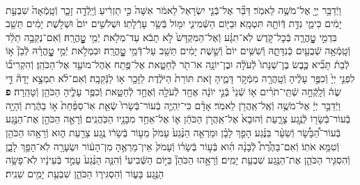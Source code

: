 \documentclass[twoside, openany, parskip=half, 11pt]{book}
\begin{document}
\begin{footnotesize}
\begin{multicols}{2}
\\
וַיְֿדַבֵּ֥ר יְיָ֖ אֶל־מֹשֶׁ֥ה לֵּאמֹֽר׃ דַּבֵּ֞ר אֶל־בְּֿנֵ֤י יִשְׂרָאֵל֙ לֵאמֹ֔ר אִשָּׁה֙ כִּ֣י תַזְרִ֔יעַ וְֿיָֽלְֿדָ֖ה זָכָ֑ר וְֿטָֽמְֿאָה֙ שִׁבְעַ֣ת יָמִ֔ים כִּימֵ֛י נִדַּ֥ת דְּֿוֹתָ֖הּ תִּטְמָֽא׃ וּבַיּ֖וֹם הַשְּֿׁמִינִ֑י יִמּ֖וֹל בְּֿשַׂ֥ר עָרְֿלָתֽוֹ׃ וּשְׁלֹשִׁ֥ים יוֹם֙ וּשְׁלֹ֣שֶׁת יָמִ֔ים תֵּשֵׁ֖ב בִּדְמֵ֣י טׇׇׇׇׇׇָֽהֳרָ֑ה בְּֿכׇל־קֹ֣דֶשׁ לֹֽא־תִגָּ֗ע וְֿאֶל־הַמִּקְדָּשׁ֙ לֹ֣א תָבֹ֔א עַד־מְלֹ֖את יְֿמֵ֥י טׇׇׇׇׇׇׇָֽהֳרָֽהּ׃  וְֿאִם־נְקֵבָ֣ה תֵלֵ֔ד וְֿטָֽמְֿאָ֥ה שְֿׁבֻעַ֖יִם כְּֿנִדָּתָ֑הּ וְֿשִׁשִּׁ֥ים יוֹם֙ וְֿשֵׁ֣שֶׁת יָמִ֔ים תֵּשֵׁ֖ב עַל־דְּֿמֵ֥י טׇׇׇׇׇׇׇָֽהֳרָֽה׃ וּבִמְלֹ֣את יְֿמֵ֣י טׇׇׇׇׇׇָֽהֳרָ֗הּ לְֿבֵן֘ א֣וֹ לְֿבַת֒ תָּבִ֞יא כֶּ֤בֶשׂ בֶּן־שְׁנָתוֹ֙ לְֿעֹלָ֔ה וּבֶן־יוֹנָ֥ה אוֹ־תֹ֖ר לְֿחַטָּ֑את אֶל־פֶּ֥תַח אֹֽהֶל־מוֹעֵ֖ד אֶל־הַכֹּהֵֽן׃ וְֿהִקְרִיב֞וֹ לִפְנֵ֤י יְיָ֙ וְֿכִפֶּ֣ר עָלֶ֔יהָ וְֿטָֽהֲרָ֖ה מִמְּֿקֹ֣ר דָּמֶ֑יהָ זֹ֤את תּוֹרַת֙ הַיֹּלֶ֔דֶת לַזָּכָ֖ר א֥וֹ לַנְּֿקֵבָֽה׃ וְֿאִם־לֹ֨א תִמְצָ֣א יָדָהּ֘ דֵּ֣י שֶׂה֒ וְֿלָֽקְֿחָ֣ה שְֿׁתֵּֽי־תֹרִ֗ים א֤וֹ שְֿׁנֵי֙ בְּֿנֵ֣י יוֹנָ֔ה אֶחָ֥ד לְֿעֹלָ֖ה וְֿאֶחָ֣ד לְֿחַטָּ֑את וְֿכִפֶּ֥ר עָלֶ֛יהָ הַכֹּהֵ֖ן וְֿטָהֵֽרָה׃ \textbf{פ}
וַיְֿדַבֵּ֣ר יְיָ֔ אֶל־מֹשֶׁ֥ה וְֿאֶֽל־אַֽהֲרֹ֖ן לֵאמֹֽר׃ אָדָ֗ם כִּי־יִֽהְיֶ֤ה בְֿעוֹר־בְּֿשָׂרוֹ֙ שְֿׂאֵ֤ת אֽוֹ־סַפַּ֨חַת֙ א֣וֹ בַהֶ֔רֶת וְֿהָיָ֥ה בְֿעוֹר־בְּֿשָׂר֖וֹ לְֿנֶ֣גַע צָרָ֑עַת וְֿהוּבָא֙ אֶל־אַֽהֲרֹ֣ן הַכֹּהֵ֔ן א֛וֹ אֶל־אַחַ֥ד מִבָּנָ֖יו הַכֹּֽהֲנִֽים׃ וְֿרָאָ֣ה הַכֹּהֵ֣ן אֶת־הַנֶּ֣גַע בְּֿעוֹר־הַ֠בָּשָׂ֠ר וְֿשֵׂעָ֨ר בַּנֶּ֜גַע הָפַ֣ךְ לָבָ֗ן וּמַרְאֵ֤ה הַנֶּ֨גַע֙ עָמֹק֙ מֵע֣וֹר בְּֿשָׂר֔וֹ נֶ֥גַע צָרַ֖עַת ה֑וּא וְֿרָאָ֥הוּ הַכֹּהֵ֖ן וְֿטִמֵּ֥א אֹתֽוֹ׃ וְֿאִם־בַּהֶ֩רֶת֩ לְֿבָנָ֨ה הִ֜וא בְּֿע֣וֹר בְּֿשָׂר֗וֹ וְֿעָמֹק֙ אֵין־מַרְאֶ֣הָ מִן־הָע֔וֹר וּשְׂעָרָ֖ה לֹֽא־הָפַ֣ךְ לָבָ֑ן וְֿהִסְגִּ֧יר הַכֹּהֵ֛ן אֶת־הַנֶּ֖גַע שִׁבְעַ֥ת יָמִֽים׃ וְֿרָאָ֣הוּ הַכֹּהֵן֘ בַּיּ֣וֹם הַשְּֿׁבִיעִי֒ וְֿהִנֵּ֤ה הַנֶּ֨גַע֙ עָמַ֣ד בְּֿעֵינָ֔יו לֹֽא־פָשָׂ֥ה הַנֶּ֖גַע בָּע֑וֹר וְֿהִסְגִּיר֧וֹ הַכֹּהֵ֛ן שִׁבְעַ֥ת יָמִ֖ים שֵׁנִֽית׃


\end{multicols}
\end{footnotesize}
\end{document}
